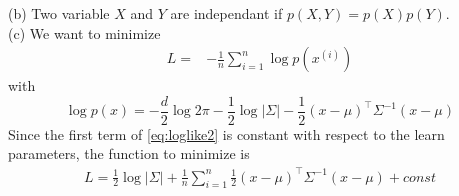 \documentclass[12pt]{article}
\begin{document}
(b) Two variable $X$ and $Y$ are independant if $p(X, Y)=p(X)p(Y)$.\\

(c) We want to minimize 
\begin{equation}
\begin{split}
    L =& - \frac{1}{n}\sum_{i=1}^n \log p(x^{(i)})
\end{split}
\end{equation}
with
\begin{equation}
    \log p(x) = -\frac{d}{2}\log 2\pi - \frac{1}{2}\log|\Sigma| - \frac{1}{2}(x-\mu)^\top\Sigma^{-1}(x-\mu)
    \label{eq:loglike2}
\end{equation}
Since the first term of \ref{eq:loglike2} is constant with respect to the learn parameters, the function to minimize is
\begin{equation}
\begin{split}
    L = \frac{1}{2}\log|\Sigma| + \frac{1}{n}\sum_{i=1}^n\frac{1}{2}(x-\mu)^\top\Sigma^{-1}(x-\mu) + const
\end{split}
\label{eq:loglike3}
\end{equation}
\end{document}
